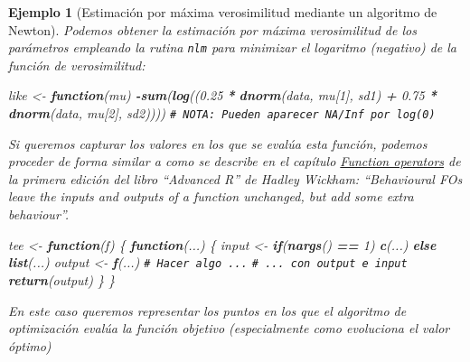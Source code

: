 \documentclass[
  spanish,
  10pt,
]{book}
\newenvironment{Shaded}{\begin{snugshade}}{\end{snugshade}}
\newcommand{\CommentTok}[1]{\textcolor[rgb]{0.56,0.35,0.01}{\textit{#1}}}
\newcommand{\ControlFlowTok}[1]{\textcolor[rgb]{0.13,0.29,0.53}{\textbf{#1}}}
\newcommand{\DecValTok}[1]{\textcolor[rgb]{0.00,0.00,0.81}{#1}}
\newcommand{\FloatTok}[1]{\textcolor[rgb]{0.00,0.00,0.81}{#1}}
\newcommand{\FunctionTok}[1]{\textcolor[rgb]{0.13,0.29,0.53}{\textbf{#1}}}
\newcommand{\NormalTok}[1]{#1}
\newcommand{\OtherTok}[1]{\textcolor[rgb]{0.56,0.35,0.01}{#1}}
\newcommand{\SpecialCharTok}[1]{\textcolor[rgb]{0.81,0.36,0.00}{\textbf{#1}}}
\theoremstyle{break}
\newtheorem{example}{Ejemplo}[chapter]
\theoremstyle{nonumberplain}
\renewcommand{\CommentTok}[1]{\textcolor[rgb]{0.41,0.41,0.41}{\texttt{#1}}}
\begin{document}
\begin{example}[Estimación por máxima verosimilitud mediante un algoritmo de Newton]
Podemos obtener la estimación por máxima verosimilitud de los parámetros empleando la rutina \texttt{nlm} para minimizar el logaritmo (negativo) de la función de verosimilitud:

\begin{Shaded}
\begin{Highlighting}[]
\NormalTok{like }\OtherTok{\textless{}{-}} \ControlFlowTok{function}\NormalTok{(mu)}
  \SpecialCharTok{{-}}\FunctionTok{sum}\NormalTok{(}\FunctionTok{log}\NormalTok{((}\FloatTok{0.25} \SpecialCharTok{*} \FunctionTok{dnorm}\NormalTok{(data, mu[}\DecValTok{1}\NormalTok{], sd1) }\SpecialCharTok{+} \FloatTok{0.75} \SpecialCharTok{*} \FunctionTok{dnorm}\NormalTok{(data, mu[}\DecValTok{2}\NormalTok{], sd2))))}
  \CommentTok{\# NOTA: Pueden aparecer NA/Inf por log(0)}
\end{Highlighting}
\end{Shaded}

Si queremos capturar los valores en los que se evalúa esta función, podemos proceder de forma similar a como se describe en el capítulo
\href{http://adv-r.had.co.nz/Function-operators.html\#behavioural-fos}{Function operators}
de la primera edición del libro ``Advanced R'' de Hadley Wickham:
``Behavioural FOs leave the inputs and outputs of a function unchanged,
but add some extra behaviour''.

\begin{Shaded}
\begin{Highlighting}[]
\NormalTok{tee }\OtherTok{\textless{}{-}} \ControlFlowTok{function}\NormalTok{(f) \{}
  \ControlFlowTok{function}\NormalTok{(...) \{}
\NormalTok{    input }\OtherTok{\textless{}{-}} \ControlFlowTok{if}\NormalTok{(}\FunctionTok{nargs}\NormalTok{() }\SpecialCharTok{==} \DecValTok{1}\NormalTok{) }\FunctionTok{c}\NormalTok{(...) }\ControlFlowTok{else} \FunctionTok{list}\NormalTok{(...)}
\NormalTok{    output }\OtherTok{\textless{}{-}} \FunctionTok{f}\NormalTok{(...)}
    \CommentTok{\# Hacer algo ...}
    \CommentTok{\# ... con output e input}
    \FunctionTok{return}\NormalTok{(output)}
\NormalTok{  \}}
\NormalTok{\}}
\end{Highlighting}
\end{Shaded}

En este caso queremos representar los puntos en los que el algoritmo de optimización evalúa la función objetivo (especialmente como evoluciona el valor óptimo)


\end{example}
\end{document}
